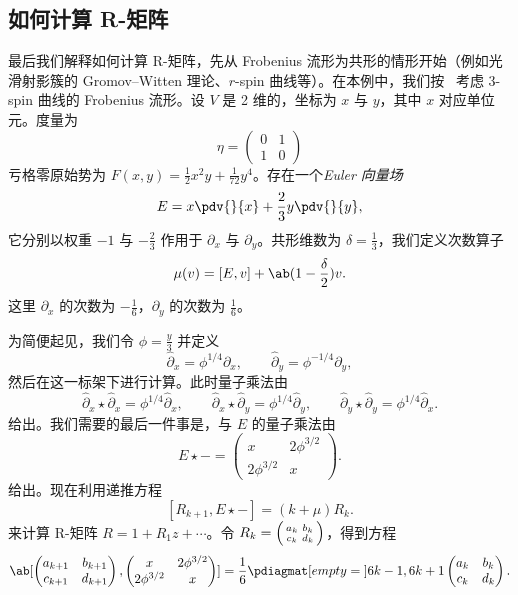 \subsection{如何计算 R-矩阵}%
\label{sub:How to compute the R-matrix}

最后我们解释如何计算 R-矩阵，先从 Frobenius 流形为共形的情形开始（例如光滑射影簇的 Gromov--Witten 理论、\(r\)-spin 曲线等）。在本例中，我们按~\cite{PPZ2015} 考虑 3-spin 曲线的 Frobenius 流形。设 \(V\) 是 2 维的，坐标为 \(x\) 与 \(y\)，其中 \(x\) 对应单位元。度量为
\[ \eta = \begin{pmatrix}
    0 & 1 \\
    1 & 0
\end{pmatrix} \]
亏格零原始势为 \(F(x,y) = \frac{1}{2} x^2 y + \frac{1}{72} y^4\)。存在一个\textit{Euler 向量场}
\[ E = x \pdv{}{x} + \frac{2}{3} y \pdv{}{y}, \]
它分别以权重 \(-1\) 与 \(-\frac{2}{3}\) 作用于 \(\partial_x\) 与 \(\partial_y\)。共形维数为 \(\delta = \frac{1}{3}\)，我们定义次数算子
\[ \mu(v) = [E,v] + \ab(1 - \frac{\delta}{2})v. \]
这里 \(\partial_x\) 的次数为 \(-\frac{1}{6}\)，\(\partial_y\) 的次数为 \(\frac{1}{6}\)。

为简便起见，我们令 \(\phi = \frac{y}{3}\) 并定义
\[ \hat{\partial}_x = \phi^{1/4} \partial_x, \qquad \hat{\partial}_y = \phi^{-1/4} \partial_y, \]
然后在这一标架下进行计算。此时量子乘法由
\[ \hat{\partial}_x \star \hat{\partial}_x = \phi^{1/4} \hat{\partial}_x, \qquad \hat{\partial}_x \star \hat{\partial}_y = \phi^{1/4} \hat{\partial}_y, \qquad \hat{\partial}_y \star \hat{\partial}_y = \phi^{1/4} \hat{\partial}_x. \]
给出。我们需要的最后一件事是，与 \(E\) 的量子乘法由
\[ E \star - = \begin{pmatrix}
    x & 2 \phi^{3/2} \\
    2 \phi^{3/2} & x
\end{pmatrix}. \]
给出。现在利用递推方程
\[ [R_{k+1}, E \star -] = (k + \mu) R_k. \]
来计算 R-矩阵 \(R = 1 + R_1 z + \cdots\)。令 \(R_k = \begin{psmallmatrix}
    a_k & b_k \\
    c_k & d_k
\end{psmallmatrix}\)，得到方程
\[ \ab[
    \begin{pmatrix}
        a_{k+1} & b_{k+1} \\
        c_{k+1} & d_{k+1}
    \end{pmatrix}, \begin{pmatrix}
        x & 2 \phi^{3/2} \\
        2 \phi^{3/2} & x
    \end{pmatrix}
] = \frac{1}{6} \pdiagmat[empty={}]{6k-1, 6k+1} \begin{pmatrix}
    a_k & b_k \\
    c_k & d_k
\end{pmatrix}. \]

